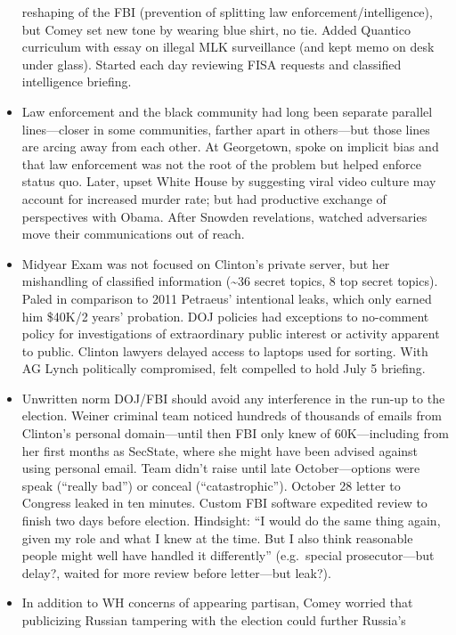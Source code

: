 \documentclass[
]{article}
\begin{document}
\begin{itemize}
  reshaping of the FBI (prevention of splitting law
  enforcement/intelligence), but Comey set new tone by wearing blue
  shirt, no tie. Added Quantico curriculum with essay on illegal MLK
  surveillance (and kept memo on desk under glass). Started each day
  reviewing FISA requests and classified intelligence briefing.
\item
  Law enforcement and the black community had long been separate
  parallel lines---closer in some communities, farther apart in
  others---but those lines are arcing away from each other. At
  Georgetown, spoke on implicit bias and that law enforcement was not
  the root of the problem but helped enforce status quo. Later, upset
  White House by suggesting viral video culture may account for
  increased murder rate; but had productive exchange of perspectives
  with Obama. After Snowden revelations, watched adversaries move their
  communications out of reach.
\item
  Midyear Exam was not focused on Clinton's private server, but her
  mishandling of classified information (\textasciitilde36 secret
  topics, 8 top secret topics). Paled in comparison to 2011 Petraeus'
  intentional leaks, which only earned him \$40K/2 years' probation. DOJ
  policies had exceptions to no-comment policy for investigations of
  extraordinary public interest or activity apparent to public. Clinton
  lawyers delayed access to laptops used for sorting. With AG Lynch
  politically compromised, felt compelled to hold July 5 briefing.
\item
  Unwritten norm DOJ/FBI should avoid any interference in the run-up to
  the election. Weiner criminal team noticed hundreds of thousands of
  emails from Clinton's personal domain---until then FBI only knew of
  60K---including from her first months as SecState, where she might
  have been advised against using personal email. Team didn't raise
  until late October---options were speak (``really bad'') or conceal
  (``catastrophic''). October 28 letter to Congress leaked in ten
  minutes. Custom FBI software expedited review to finish two days
  before election. Hindsight: ``I would do the same thing again, given
  my role and what I knew at the time. But I also think reasonable
  people might well have handled it differently'' (e.g.~special
  prosecutor---but delay?, waited for more review before letter---but
  leak?).
\item
  In addition to WH concerns of appearing partisan, Comey worried that
  publicizing Russian tampering with the election could further Russia's

\end{itemize}
\end{document}
